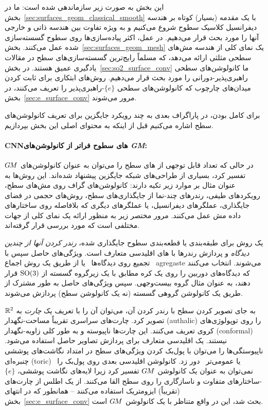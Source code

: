 \etocsettocstyle{}{} %
\localtableofcontents


این بخش به صورت زیر سازماندهی شده است:
ما در بخش~\ref{sec:surfaces_geom_classical_smooth} با یک مقدمه (بسیار) کوتاه بر هندسه دیفرانسیل کلاسیک سطوح شروع می‌کنیم و به ویژه تفاوت بین هندسه ذاتی و خارجی آنها را مورد بحث قرار می‌دهیم.
در عمل، اکثر پیاده‌سازی‌ها روی سطوح گسسته‌سازی شده عمل می‌کنند.
بخش~\ref{sec:surfaces_geom_mesh} یک نمای کلی از هندسه مش‌های سطحی مثلثی ارائه می‌دهد، که مسلماً رایج‌ترین گسسته‌سازی‌های سطح در مقالات یادگیری عمیق هستند.
در بخش~\ref{sec:so2_surface_conv} ما کانولوشن‌های سطحی راهبری‌پذیر-دورانی را مورد بحث قرار می‌دهیم.
روش‌های ابتکاری برای ثابت کردن میدان‌های چارچوب که کانولوشن‌های سطحی $\{e\}$-راهبری‌پذیر را تعریف می‌کنند، در بخش~\ref{sec:e_surface_conv} مرور می‌شوند.


برای کامل بودن، در پاراگراف بعدی به چند رویکرد جایگزین برای تعریف کانولوشن‌های سطح اشاره می‌کنیم
قبل از اینکه به محتوای اصلی این بخش بپردازیم.

\paragraph{CNNهای سطوح فراتر از کانولوشن‌های \textit{GM}:}

در حالی که تعداد قابل توجهی از های سطح را می‌توان به عنوان کانولوشن‌های $G\mkern-1.4muM$ تفسیر کرد، بسیاری از طراحی‌های شبکه جایگزین پیشنهاد شده‌اند.
این روش‌ها به عنوان مثال بر موارد زیر تکیه دارند:
کانولوشن‌های گراف روی مش‌های سطح،
رویکردهای طیفی،
رندرهای چند-نما از جایگذاری‌های سطح،
روش‌های حجمی در فضای جایگذاری،
عملگرهای دیفرانسیل،
یا عملگرهای دیگری که بلافاصله روی ساختارهای داده مش عمل می‌کنند.
مرور مختصر زیر به منظور ارائه یک نمای کلی از جهات مختلفی است که مورد بررسی قرار گرفته‌اند.


یک روش برای طبقه‌بندی یا قطعه‌بندی سطوح جایگذاری شده، \emph{رندر کردن آنها از چندین دیدگاه} و پردازش رندرها با های اقلیدسی متعارف است.
ویژگی‌های حاصل سپس با
تجمیع روی دیدگاه‌ها~\cite{su2015multi,qi2016volumetric}
یا از طریق یک روش اجماع~\cite{paulsen2018multi} agregaste می‌شوند.
\citet{esteves2019multiView} انتخاب می‌کنند که دیدگاه‌های دوربین را روی یک کره مطابق با یک زیرگروه گسسته از $\operatorname{SO}(3)$ قرار دهند، به عنوان مثال گروه بیست‌وجهی.
سپس ویژگی‌های حاصل به طور مشترک از طریق یک کانولوشن گروهی گسسته (نه یک کانولوشن سطح) پردازش می‌شوند.


به جای تصویر کردن سطح با رندر کردن آن، می‌توان آن را با تعریف یک \emph{چارت} به $\mathbb{R}^2$ تصویر کرد.
\citet{sinha2016deep} چارت‌های سراسری تقریباً مساحت-نگهدار (authalic) را روی توپولوژی‌های کروی تعریف می‌کنند.
این چارت‌ها ناپیوسته و به طور کلی زاویه-نگهدار (conformal) نیستند.
یک  اقلیدسی متعارف برای پردازش تصاویر حاصل استفاده می‌شود.
ناپیوستگی‌ها را می‌توان با پول‌بک کردن ویژگی‌های سطح در امتداد نگاشت‌های پوششی چنبره‌ای (toric)~\cite{maron2017convolutional} یا عمومی‌تر~\cite{haim2018surface,benhamu2018multichart} دور زد.
کانولوشن اقلیدسی بعدی روی پول‌بک را نمی‌توان به عنوان یک کانولوشن $G\mkern-1.4muM$ تفسیر کرد زیرا لایه‌های نگاشت پوششی، $\{e\}$-ساختارهای متفاوت و ناسازگاری را روی سطح القا می‌کنند.
\citet{li2019crossAtlas} از یک اطلس از چارت‌های (تقریباً) ایزومتریک استفاده می‌کنند -- همانطور که در انتهای بخش~\ref{sec:e_surface_conv} بحث شد، این در واقع متناظر با یک کانولوشن $G\mkern-1.4muM$ است.


